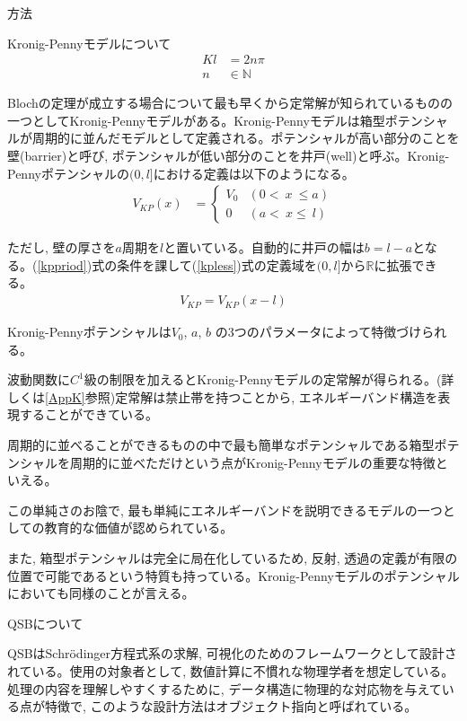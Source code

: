 \documentclass[a4paper, lualatex]{bxjsarticle}
\newcommand{\eref}[1]{(\ref{#1})式}
\begin{document}
\begin{section}{方法}
\begin{subsection}{Kronig-Pennyモデルについて}
        \begin{align}
         Kl&=2n\pi\nonumber\\
            n&\in \mathbb{N}
        \end{align}
        \par Blochの定理が成立する場合について最も早くから定常解が知られているものの一つとしてKronig-Pennyモデルがある。Kronig-Pennyモデルは箱型ポテンシャルが周期的に並んだモデルとして定義される。ポテンシャルが高い部分のことを壁(barrier)と呼び, ポテンシャルが低い部分のことを井戸(well)と呼ぶ\cite{Anker}。Kronig-Pennyポテンシャルの$(0, l]$における定義は以下のようになる。
        \begin{align}
         V_{KP}(x)&=\begin{cases}V_0&(0 <\ x\ \le a)\\ 0&(a <\ x\le\ l) \end{cases}\label{kpless}
        \end{align}
        \par ただし, 壁の厚さを$a$周期を$l$と置いている。自動的に井戸の幅は$b=l-a$となる。\eref{kppriod}の条件を課して\eref{kpless}の定義域を$(0, l]$から$\mathbb{R}$に拡張できる。
        \begin{align}
        V_{KP}=V_{KP}(x-l)
        \label{kppriod}
        \end{align}
        \par Kronig-Pennyポテンシャルは$V_0$, $a$, $b$ の3つのパラメータによって特徴づけられる。
        \par 波動関数に$C^1$級の制限を加えるとKronig-Pennyモデルの定常解が得られる。(詳しくは\ref{AppK}参照)定常解は禁止帯を持つことから, エネルギーバンド構造を表現することができている。
        \par 周期的に並べることができるものの中で最も簡単なポテンシャルである箱型ポテンシャルを周期的に並べただけという点がKronig-Pennyモデルの重要な特徴といえる。
        \par この単純さのお陰で, 最も単純にエネルギーバンドを説明できるモデルの一つとしての教育的な価値が認められている\cite{Pavelich}。
        \par また, 箱型ポテンシャルは完全に局在化しているため, 反射, 透過の定義が有限の位置で可能であるという特質も持っている。Kronig-Pennyモデルのポテンシャルにおいても同様のことが言える。
    \end{subsection}
    \begin{subsection}{QSBについて}
    \par QSBはSchrödinger方程式系の求解, 可視化のためのフレームワークとして設計されている。使用の対象者として, 数値計算に不慣れな物理学者を想定している。処理の内容を理解しやすくするために, データ構造に物理的な対応物を与えている点が特徴で, このような設計方法はオブジェクト指向と呼ばれている。

\end{subsection}
\end{section}
\end{document}

